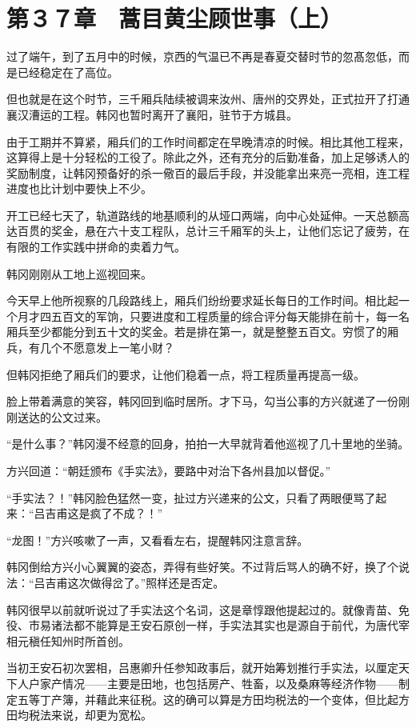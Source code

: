 \section{第３７章　蒿目黄尘顾世事（上）}

过了端午，到了五月中的时候，京西的气温已不再是春夏交替时节的忽髙忽低，而是已经稳定在了高位。

但也就是在这个时节，三千厢兵陆续被调来汝州、唐州的交界处，正式拉开了打通襄汉漕运的工程。韩冈也暂时离开了襄阳，驻节于方城县。

由于工期并不算紧，厢兵们的工作时间都定在早晚清凉的时候。相比其他工程来，这算得上是十分轻松的工役了。除此之外，还有充分的后勤准备，加上足够诱人的奖励制度，让韩冈预备好的杀一儆百的最后手段，并没能拿出来亮一亮相，连工程进度也比计划中要快上不少。

开工已经七天了，轨道路线的地基顺利的从垭口两端，向中心处延伸。一天总额高达百贯的奖金，悬在六十支工程队，总计三千厢军的头上，让他们忘记了疲劳，在有限的工作实践中拼命的卖着力气。

韩冈刚刚从工地上巡视回来。

今天早上他所视察的几段路线上，厢兵们纷纷要求延长每日的工作时间。相比起一个月才四五百文的军饷，只要进度和工程质量的综合评分每天能排在前十，每一名厢兵至少都能分到五十文的奖金。若是排在第一，就是整整五百文。穷惯了的厢兵，有几个不愿意发上一笔小财？

但韩冈拒绝了厢兵们的要求，让他们稳着一点，将工程质量再提高一级。

脸上带着满意的笑容，韩冈回到临时居所。才下马，勾当公事的方兴就递了一份刚刚送达的公文过来。

“是什么事？”韩冈漫不经意的回身，拍拍一大早就背着他巡视了几十里地的坐骑。

方兴回道：“朝廷颁布《手实法》，要路中对治下各州县加以督促。”

“手实法？！”韩冈脸色猛然一变，扯过方兴递来的公文，只看了两眼便骂了起来：“吕吉甫这是疯了不成？！”

“龙图！”方兴咳嗽了一声，又看看左右，提醒韩冈注意言辞。

韩冈倒给方兴小心翼翼的姿态，弄得有些好笑。不过背后骂人的确不好，换了个说法：“吕吉甫这次做得岔了。”照样还是否定。

韩冈很早以前就听说过了手实法这个名词，这是章惇跟他提起过的。就像青苗、免役、市易诸法都不能算是王安石原创一样，手实法其实也是源自于前代，为唐代宰相元稹任知州时所首创。

当初王安石初次罢相，吕惠卿升任参知政事后，就开始筹划推行手实法，以厘定天下人户家产情况——主要是田地，也包括房产、牲畜，以及桑麻等经济作物——制定五等丁产簿，并藉此来征税。这的确可以算是方田均税法的一个变体，但比起方田均税法来说，却更为宽松。

